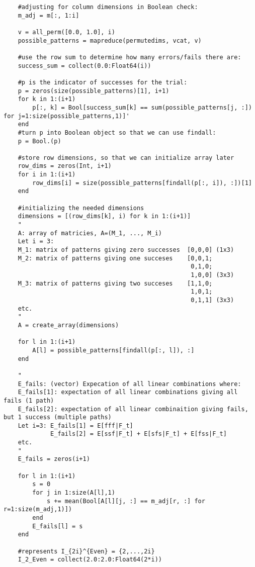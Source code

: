 \begin{verbatim}
    #adjusting for column dimensions in Boolean check:
    m_adj = m[:, 1:i]

    v = all_perm([0.0, 1.0], i)
    possible_patterns = mapreduce(permutedims, vcat, v)
    
    #use the row sum to determine how many errors/fails there are:
    success_sum = collect(0.0:Float64(i))
    
    #p is the indicator of successes for the trial:
    p = zeros(size(possible_patterns)[1], i+1)
    for k in 1:(i+1)
        p[:, k] = Bool[success_sum[k] == sum(possible_patterns[j, :]) for j=1:size(possible_patterns,1)]'
    end
    #turn p into Boolean object so that we can use findall:
    p = Bool.(p)

    #store row dimensions, so that we can initialize array later
    row_dims = zeros(Int, i+1)
    for i in 1:(i+1)
        row_dims[i] = size(possible_patterns[findall(p[:, i]), :])[1]
    end
    
    #initializing the needed dimensions
    dimensions = [(row_dims[k], i) for k in 1:(i+1)] 
    " 
    A: array of matricies, A=(M_1, ..., M_i)
    Let i = 3:
    M_1: matrix of patterns giving zero successes  [0,0,0] (1x3)
    M_2: matrix of patterns giving one succeses    [0,0,1;
                                                    0,1,0; 
                                                    1,0,0] (3x3)
    M_3: matrix of patterns giving two succeses    [1,1,0;
                                                    1,0,1;
                                                    0,1,1] (3x3)                                                
    etc. 
    "
    A = create_array(dimensions) 

    for l in 1:(i+1)
        A[l] = possible_patterns[findall(p[:, l]), :]
    end

    " 
    E_fails: (vector) Expecation of all linear combinations where: 
    E_fails[1]: expectation of all linear combinations giving all fails (1 path)
    E_fails[2]: expectation of all linear combinaition giving fails, but 1 success (multiple paths)
    Let i=3: E_fails[1] = E[fff|F_t]
             E_fails[2] = E[ssf|F_t] + E[sfs|F_t] + E[fss|F_t]
    etc.
    "
    E_fails = zeros(i+1)

    for l in 1:(i+1)
        s = 0 
        for j in 1:size(A[l],1)
            s += mean(Bool[A[l][j, :] == m_adj[r, :] for r=1:size(m_adj,1)])
        end
        E_fails[l] = s
    end 
    
    #represents I_{2i}^{Even} = {2,...,2i}
    I_2_Even = collect(2.0:2.0:Float64(2*i))


\end{verbatim}
